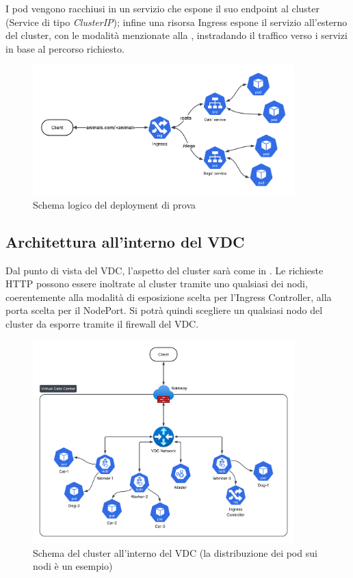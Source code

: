 \documentclass[12pt,a4paper,openright,twoside]{book}
\begin{document}
I pod vengono racchiusi in un servizio che espone il suo endpoint al cluster (Service di tipo \textit{ClusterIP}); infine una risorsa Ingress espone il servizio all'esterno del cluster,
con le modalità menzionate alla , instradando il traffico verso i servizi in base al percorso richiesto.
\begin{figure}[!hbt]
    \centering
    \includegraphics[width=0.9\textwidth]{figures/test-deployment.png}
    \caption{Schema logico del deployment di prova}
    \label{fig:test-deployment}
\end{figure}
\FloatBarrier
\subsection{Architettura all'interno del VDC}
Dal punto di vista del VDC, l'aspetto del cluster sarà come in . Le richieste HTTP possono essere inoltrate al cluster tramite uno qualsiasi dei nodi,
coerentemente alla modalità di esposizione scelta per l'Ingress Controller, alla porta scelta per il NodePort. Si potrà quindi scegliere un qualsiasi nodo del cluster 
da esporre tramite il firewall del VDC.
\begin{figure}[!hbt]
    \centering
    \includegraphics[width=0.9\textwidth]{figures/test-vdc.png}
    \caption{Schema del cluster all'interno del VDC (la distribuzione dei pod sui nodi è un esempio)}
    \label{fig:test-vdc}
\end{figure}
\FloatBarrier
\end{document}
